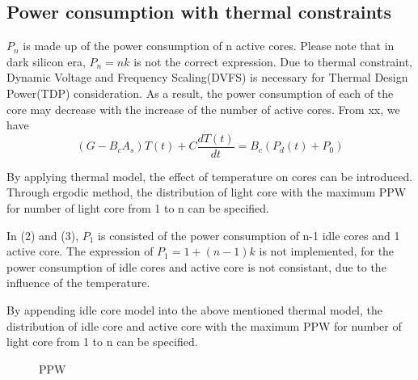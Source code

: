 \subsection{Power consumption with thermal constraints}
$P_{n}$ is made up of the power consumption of n active cores. Please note that in dark silicon
era, $P_{n} = nk$ is not the correct expression. Due to thermal constraint, Dynamic Voltage and
Frequency Scaling(DVFS) is necessary for Thermal Design Power(TDP) consideration. As a result,
the power consumption of each of the core may decrease with the increase of the number of active cores.
From xx, we have
\begin{equation}\label{gt=bp}
(G - B_{c}A_{s})T(t) + C\frac{dT(t)}{dt}= B_{c}(P_{d}(t) + P_{0})
\end{equation}

By applying thermal model, the effect of temperature on cores can be introduced. 
Through ergodic method, the distribution of light core with the maximum PPW
for number of light core from 1 to n can be specified.

In (2) and (3), $P_{1}$ is consisted of the power consumption of n-1 idle cores and 1 active 
core. The expression of $P_{1} = 1+(n-1)k$ is not implemented, for the power consumption of 
idle cores and active core is not consistant, due to the influence of the temperature.

By appending idle core model into the above mentioned thermal model, the distribution of idle
core and active core with the maximum PPW for number of light core from 1 to n can be specified.

\begin{figure}[htb]
\centering
{}
\caption{PPW}  
\label{fig:ppw}
\end{figure}

